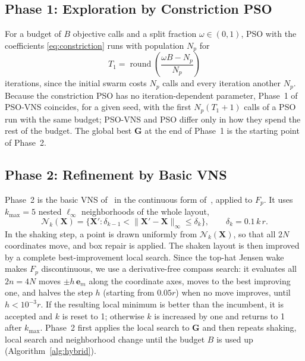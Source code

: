\documentclass[journal,twoside]{IEEEtran}
\begin{document}
\subsection{Phase 1: Exploration by Constriction PSO}
For a budget of $B$ objective calls and a split fraction $\omega\in(0,1)$, PSO with the coefficients \eqref{eq:constriction} runs with population $N_p$ for
\[
T_1=\operatorname{round}\!\left(\frac{\omega B-N_p}{N_p}\right)
\]
iterations, since the initial swarm costs $N_p$ calls and every iteration another $N_p$. Because the constriction PSO has no iteration-dependent parameter, Phase~1 of PSO-VNS coincides, for a given seed, with the first $N_p(T_1+1)$ calls of a PSO run with the same budget; PSO-VNS and PSO differ only in how they spend the rest of the budget. The global best $\mathbf G$ at the end of Phase~1 is the starting point of Phase~2.

\subsection{Phase 2: Refinement by Basic VNS}
Phase~2 is the basic VNS of~\cite{Mladenovic1997,Hansen2001} in the continuous form of~\cite{Mladenovic2008}, applied to $F_p$. It uses $k_{\max}=5$ nested $\ell_\infty$ neighborhoods of the whole layout,
\[
\mathcal N_k(\mathbf X)=\{\mathbf X':\delta_{k-1}<\lVert \mathbf X'-\mathbf X\rVert_\infty\le\delta_k\},\qquad \delta_k=0.1\,k\,r .
\]
In the shaking step, a point is drawn uniformly from $\mathcal N_k(\mathbf X)$, so that all $2N$ coordinates move, and box repair is applied. The shaken layout is then improved by a complete best-improvement local search. Since the top-hat Jensen wake makes $F_p$ discontinuous, we use a derivative-free compass search: it evaluates all $2n=4N$ moves $\pm h\,\mathbf e_m$ along the coordinate axes, moves to the best improving one, and halves the step $h$ (starting from $0.05r$) when no move improves, until $h<10^{-3}r$. If the resulting local minimum is better than the incumbent, it is accepted and $k$ is reset to 1; otherwise $k$ is increased by one and returns to 1 after $k_{\max}$. Phase~2 first applies the local search to $\mathbf G$ and then repeats shaking, local search and neighborhood change until the budget $B$ is used up (Algorithm~\ref{alg:hybrid}).
\end{document}

